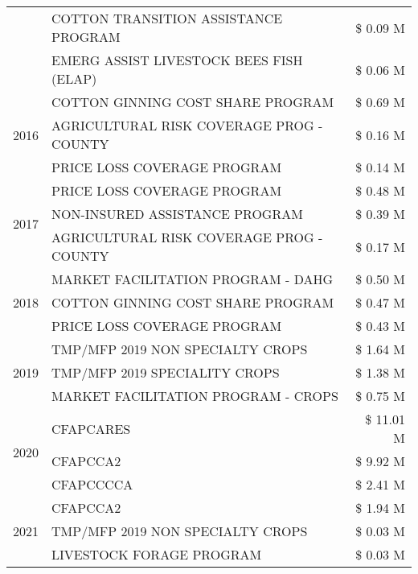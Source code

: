 \begin{tabular}{llr}
 & COTTON TRANSITION ASSISTANCE PROGRAM & \$ 0.09 M \\
 & EMERG ASSIST LIVESTOCK BEES FISH (ELAP) & \$ 0.06 M \\
\cline{1-3}
\multirow[t]{3}{*}{2016} & COTTON GINNING COST SHARE PROGRAM & \$ 0.69 M \\
 & AGRICULTURAL RISK COVERAGE PROG - COUNTY & \$ 0.16 M \\
 & PRICE LOSS COVERAGE PROGRAM & \$ 0.14 M \\
\cline{1-3}
\multirow[t]{3}{*}{2017} & PRICE LOSS COVERAGE PROGRAM & \$ 0.48 M \\
 & NON-INSURED ASSISTANCE PROGRAM & \$ 0.39 M \\
 & AGRICULTURAL RISK COVERAGE PROG - COUNTY & \$ 0.17 M \\
\cline{1-3}
\multirow[t]{3}{*}{2018} & MARKET FACILITATION PROGRAM - DAHG & \$ 0.50 M \\
 & COTTON GINNING COST SHARE PROGRAM & \$ 0.47 M \\
 & PRICE LOSS COVERAGE PROGRAM & \$ 0.43 M \\
\cline{1-3}
\multirow[t]{3}{*}{2019} & TMP/MFP 2019 NON SPECIALTY CROPS & \$ 1.64 M \\
 & TMP/MFP 2019 SPECIALITY CROPS & \$ 1.38 M \\
 & MARKET FACILITATION PROGRAM - CROPS & \$ 0.75 M \\
\cline{1-3}
\multirow[t]{3}{*}{2020} & CFAPCARES & \$ 11.01 M \\
 & CFAPCCA2 & \$ 9.92 M \\
 & CFAPCCCCA & \$ 2.41 M \\
\cline{1-3}
\multirow[t]{3}{*}{2021} & CFAPCCA2 & \$ 1.94 M \\
 & TMP/MFP 2019 NON SPECIALTY CROPS & \$ 0.03 M \\
 & LIVESTOCK FORAGE PROGRAM & \$ 0.03 M \\
\cline{1-3}
\bottomrule
\end{tabular}
